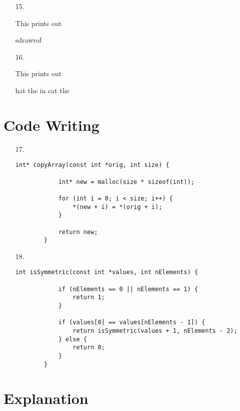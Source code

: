 \documentclass{article}
\begin{document}
\begin{itemize}
	\item[15.] \begin{answer*}
			This prints out

			sdrawrof
		\end{answer*}

	\item[16.] \begin{answer*}
			This prints out

			hat the in cat the
		\end{answer*}

\end{itemize}

\section*{Code Writing}

\begin{itemize}
	\item[17.] \begin{lstlisting}[style=nonumbers]
		int* copyArray(const int *orig, int size) {

			int* new = malloc(size * sizeof(int));

			for (int i = 0; i < size; i++) {
				*(new + i) = *(orig + i);
			}

			return new;
		}
		\end{lstlisting}
		

	\item[18.] \begin{lstlisting}[style=nonumbers]
		int isSymmetric(const int *values, int nElements) {

			if (nElements == 0 || nElements == 1) {
				return 1;
			}

			if (values[0] == values[nElements - 1]) {
				return isSymmetric(values + 1, nElements - 2);
			} else {
				return 0;
			}
		}
		\end{lstlisting}
		
		
\end{itemize}

\section*{Explanation}
\end{document}
